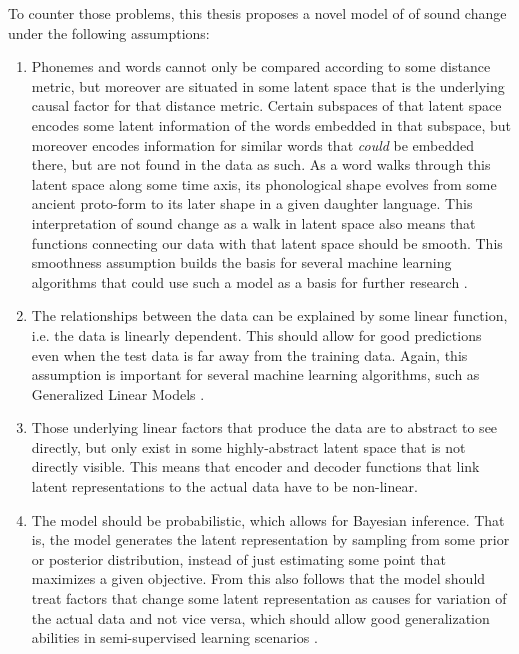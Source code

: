 \documentclass[6pt]{article}
\begin{document}
To counter those problems, this thesis proposes a novel model of of sound change under the following assumptions:
\begin{enumerate}
\item Phonemes and words cannot only be compared according to some distance metric, but moreover are situated in some latent space that is the underlying causal factor for that distance metric. Certain subspaces of that latent space encodes some latent information of the words embedded in that subspace, but moreover encodes information for similar words that \textit{could} be embedded there, but are not found in the data as such. As a word walks through this latent space along some time axis, its phonological shape evolves from some ancient proto-form to its later shape in a given daughter language. This interpretation of sound change as a walk in latent space also means that functions connecting our data with that latent space should be smooth. 
This smoothness assumption builds the basis for several machine learning algorithms that could use such a model as a basis for further research \citep[p. 557]{Goodfellow-et-al-2016-Book}. 
\item The relationships between the data can be explained by some linear function, i.e. the data is linearly dependent. This should allow for good predictions even when the test data is far away from the training data. Again, this assumption is important for several machine learning algorithms, such as Generalized Linear Models \citep[p. 557]{Goodfellow-et-al-2016-Book}.
\item Those underlying linear factors that produce the data are to abstract to see directly, but only exist in some highly-abstract latent space that is not directly visible. This means that encoder and decoder functions that link latent representations to the actual data have to be non-linear.
\item The model should be probabilistic, which allows for Bayesian inference.  That is, the model generates the latent representation by sampling from some prior or posterior distribution, instead of just estimating some point that maximizes a given objective. From this also follows that the model should treat factors that change some latent representation as causes for variation of the actual data and not vice versa, which should allow good generalization abilities in semi-supervised learning scenarios \citep[p. 557]{Goodfellow-et-al-2016-Book}.

\end{enumerate}
\end{document}
